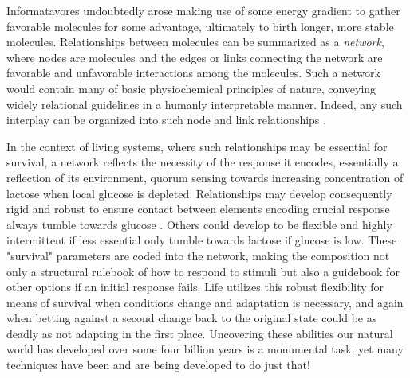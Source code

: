 Informatavores undoubtedly arose making use of some energy gradient to gather favorable molecules for some advantage, ultimately to birth longer, more stable molecules. Relationships between molecules can be summarized as a \emph{network}, where nodes are molecules and the edges or links connecting the network are favorable and unfavorable interactions among the molecules. Such a network would contain many of basic physiochemical principles of nature, conveying widely relational guidelines in a humanly interpretable manner. Indeed, any such interplay can be organized into such node and link relationships \citep{barabasi2004network}.

In the context of living systems, where such relationships may be essential for survival, a network reflects the necessity of the response it encodes, essentially a reflection of its environment, \eg \coli quorum sensing towards increasing concentration of lactose when local glucose is depleted. Relationships may develop consequently rigid and robust to ensure contact between elements encoding crucial response \eg always tumble towards glucose \citep{berg2000motile}. Others could develop to be flexible and highly intermittent if less essential \eg only tumble towards lactose if glucose is low.
These "survival" parameters are coded into the network, making the composition not only a structural rulebook of how to respond to stimuli but also a guidebook for other options if an initial response fails. 
Life utilizes this robust flexibility for means of survival when conditions change and adaptation is necessary, and again when betting against a second change back to the original state could be as deadly as not adapting in the first place. Uncovering these abilities our natural world has developed over some four billion years is a monumental task; yet many techniques have been and are being developed to do just that!

